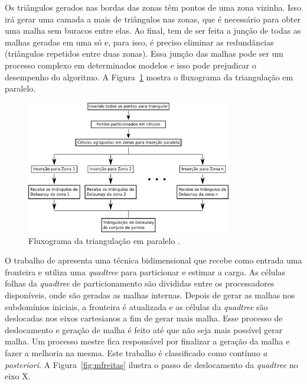     Os triângulos gerados nas bordas das zonas têm pontos de uma zona vizinha. Isso irá gerar uma camada a mais de triângulos nas zonas, que é necessário para obter uma malha sem buracos entre elas. Ao final, tem de ser feita a junção de todas as malhas geradas em uma só e, para isso, é preciso eliminar as redundâncias (triângulos repetidos entre duas zonas). Essa junção das malhas pode ser um processo complexo em determinados modelos e isso pode prejudicar o desempenho do algoritmo. A Figura~\ref{fig:lo12_2} mostra o fluxograma da triangulação em paralelo.
    
    \begin{figure}[htbp]
    	\centering
    	\includegraphics[width=0.8\textwidth]{fig/lo12_2.png}
    	\caption{ Fluxograma da triangulação em paralelo \cite{bib:Lo12}.}
    	\label{fig:lo12_2}
    \end{figure}
    
    O trabalho de \cite{bib:MFreitas13} apresenta uma técnica bidimensional que recebe como entrada uma fronteira e utiliza uma \textit{quadtree} para particionar e estimar a carga. As células folhas da \textit{quadtree} de particionamento são divididas entre os processadores disponíveis, onde são geradas as malhas internas. Depois de gerar as malhas nos subdomínios iniciais, a fronteira é atualizada e as células da \textit{quadtree} são deslocadas nos eixos cartesianos a fim de gerar mais malha. Esse processo de deslocamento e geração de malha é feito até que não seja mais possível gerar malha. Um processo mestre fica responsável por finalizar a geração da malha e fazer a melhoria na mesma. Este trabalho é classificado como contínuo \textit{a posteriori}. A Figura~\ref{fig:mfreitas} ilustra o passo de deslocamento da \textit{quadtree} no eixo X.
    
